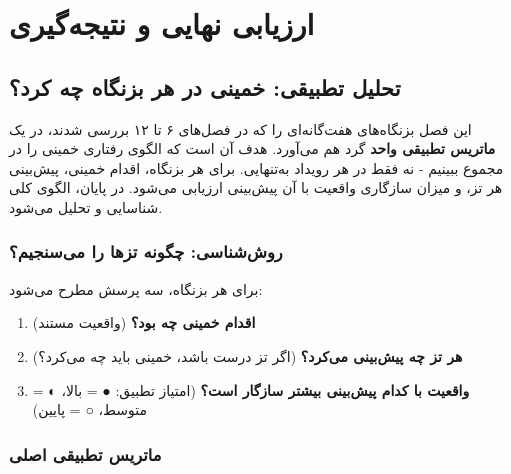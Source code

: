\documentclass[12pt,a4paper]{book}
\newcommand{\keyword}[1]{\textbf{\textcolor{cPrimary}{#1}}}
\begin{document}
\part{ارزیابی نهایی و نتیجه‌گیری}

\chapter{تحلیل تطبیقی: خمینی در هر بزنگاه چه کرد؟}
\label{chap:d600e0}


\begin{infoBox}
این فصل بزنگاه‌های هفت‌گانه‌ای را که در فصل‌های ۶ تا ۱۲ بررسی شدند، در یک \keyword{ماتریس تطبیقی واحد} گرد هم می‌آورد. هدف آن است که الگوی رفتاری خمینی را در مجموع ببینیم - نه فقط در هر رویداد به‌تنهایی. برای هر بزنگاه، اقدام خمینی، پیش‌بینی هر تز، و میزان سازگاری واقعیت با آن پیش‌بینی ارزیابی می‌شود. در پایان، الگوی کلی شناسایی و تحلیل می‌شود.
\end{infoBox}

\section{روش‌شناسی: چگونه تزها را می‌سنجیم؟}

\begin{principleBox}
برای هر بزنگاه، سه پرسش مطرح می‌شود:
\begin{enumerate}[label=\textcolor{cPrimary}{\bfseries\arabic*.}, rightmargin=2em]
    \item \textbf{اقدام خمینی چه بود؟} (واقعیت مستند)
    \item \textbf{هر تز چه پیش‌بینی می‌کرد؟} (اگر تز درست باشد، خمینی باید چه می‌کرد؟)
    \item \textbf{واقعیت با کدام پیش‌بینی بیشتر سازگار است؟} (امتیاز تطبیق: ● = بالا، ◐ = متوسط، ○ = پایین)
\end{enumerate}
\end{principleBox}

\section{ماتریس تطبیقی اصلی}
\end{document}

